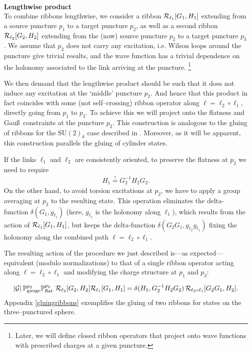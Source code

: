 \documentclass[nofootinbib,superscriptaddress,eqsecnum,tightenlines,11pt]{revtex4-1}
\def\SU{\text{SU}}
\def\mG{\mathcal{G}}
\def\ba{\begin{eqnarray}}
\def\ea{\end{eqnarray}}
\begin{document}
~\\
{\bf {Lengthwise product}}\\
To combine ribbons lengthwise, we consider a ribbon ${\cal R}_{\ell_1}[G_1,H_1]$  extending from a source puncture $p_1$ to a target puncture $p_2$, as well as a second ribbon ${\cal R}_{\ell_2}[G_2,H_2]$  extending from the (now) source puncture $p_2$ to a target puncture $p_3$. 
We assume that $p_2$ does not carry any excitation, i.e. Wilson loops around the puncture give trivial results, and the wave function has a trivial dependence on the holonomy associated to the link arriving at the puncture.%
\footnote{Later, we will define closed ribbon operators that project onto wave functions with prescribed charges at a given puncture.}

We then demand that the lengthwise product should be such that it does not induce any excitation at the `middle' puncture $p_2$.
And hence that this product in fact coincides with some (not self--crossing) ribbon operator along $\ell = \ell_2\circ\ell_1$, directly going from $p_1$ to $p_3$. 
To achieve this we will project onto the flatness and Gau\ss~constraints at the puncture $p_2$. 
This construction is analogous to the gluing of ribbons for the $\SU(2)_k$ case described in \cite{DG16}.
Moreover, as it will be apparent, this construction parallels the gluing of cylinder states.

If the links $\ell_1$ and $\ell_2$ are consistently oriented, to preserve the flatness at $p_2$ we need to require
\ba
H_1 \stackrel{!}{=}  G^{-1}_2 H_2 G_2  .
\ea
On the other hand, to avoid torsion excitations at $p_2$, we have to apply a group averaging at $p_2$ to the resulting state.
This operation eliminates the delta-function $\delta(G_1, g_{\ell_1})$ (here, $ g_{\ell_1}$ is the holonomy along $\ell_1$), which results from the action of ${\cal R}_{\ell_1}[G_1,H_1]$, but keeps the delta-function $\delta(G_2 G_1, g_{\ell_2} g_{\ell_1})$ fixing the holonomy along the combined path $\ell = \ell_2\circ\ell_1$. 



The resulting action of the procedure we just described is---as expected---equivalent (modulo normalizations) to that of a single ribbon operator acting along $\ell=\ell_2\circ\ell_1$ and modifying the charge structure at $p_1$ and $p_3$:

\ba\label{8.16}
|\mG|\,  {\mathbb P}^{p_2}_\text{gauge}  {\mathbb P}^{p_2}_\text{flat} \,\, {\cal R}_{\ell_2}[G_2,H_2]  {\cal R}_{\ell_1}[G_1,H_1]  =
\delta(H_1, G_2^{-1} H_2 G_2) \, {\cal R}_{\ell_2\circ\ell_1}[G_2 G_1, H_2]   .
\label{eq_ribbonslengthprod}
\ea
Appendix \ref{gluingribbons} exemplifies the gluing of two ribbons for states on the three--punctured sphere. 
\end{document}
